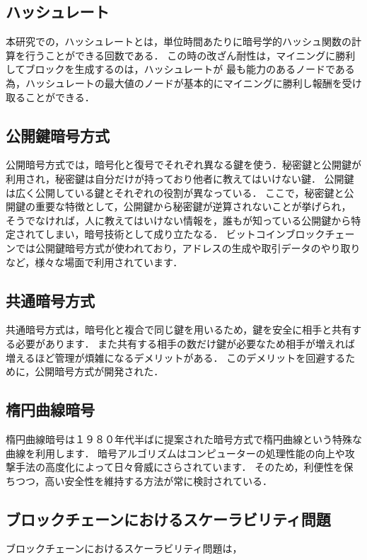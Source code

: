 \documentclass[a4paper,12pt]{jsarticle}
\begin{document}
      \subsection{ハッシュレート}
本研究での，ハッシュレートとは，単位時間あたりに暗号学的ハッシュ関数の計算を行うことができる回数である．
この時の改ざん耐性は，マイニングに勝利してブロックを生成するのは，ハッシュレートが
最も能力のあるノードである為，ハッシュレートの最大値のノードが基本的にマイニングに勝利し報酬を受け取ることができる．

      \subsection{公開鍵暗号方式}

公開暗号方式では，暗号化と復号でそれぞれ異なる鍵を使う．秘密鍵と公開鍵が利用され，秘密鍵は自分だけが持っており他者に教えてはいけない鍵．
公開鍵は広く公開している鍵とそれぞれの役割が異なっている．
ここで，秘密鍵と公開鍵の重要な特徴として，公開鍵から秘密鍵が逆算されないことが挙げられ，
そうでなければ，人に教えてはいけない情報を，誰もが知っている公開鍵から特定されてしまい，暗号技術として成り立たなる．
ビットコインブロックチェーンでは公開鍵暗号方式が使われており，アドレスの生成や取引データのやり取りなど，様々な場面で利用されています．

      \subsection{共通暗号方式}
共通暗号方式は，暗号化と複合で同じ鍵を用いるため，鍵を安全に相手と共有する必要があります．
また共有する相手の数だけ鍵が必要なため相手が増えれば増えるほど管理が煩雑になるデメリットがある．
このデメリットを回避するために，公開暗号方式が開発された．

      \subsection{楕円曲線暗号}
楕円曲線暗号は１９８０年代半ばに提案された暗号方式で楕円曲線という特殊な曲線を利用します．
暗号アルゴリズムはコンピューターの処理性能の向上や攻撃手法の高度化によって日々脅威にさらされています．
そのため，利便性を保ちつつ，高い安全性を維持する方法が常に検討されている．

      \subsection{ブロックチェーンにおけるスケーラビリティ問題}
ブロックチェーンにおけるスケーラビリティ問題は，
\end{document}
